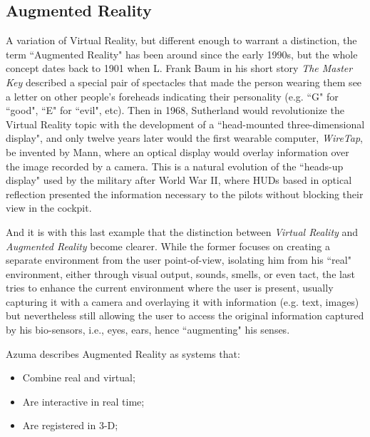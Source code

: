 \documentclass[runningheads]{llncs}
\begin{document}
\subsection{Augmented Reality}
\par A variation of Virtual Reality, but different enough to warrant a distinction, the term ``Augmented Reality" has been around since the early 1990s, but the whole concept dates back to 1901 when L. Frank Baum in his short story \textit{The Master Key} described a special pair of spectacles that made the person wearing them see a letter on other people's foreheads indicating their personality (e.g. ``G" for ``good", ``E" for ``evil", etc). Then in 1968, Sutherland would revolutionize the Virtual Reality topic with the development of a ``head-mounted three-dimensional display", and only twelve years later would the first wearable computer, \textit{WireTap}, be invented by Mann, where an optical display would overlay information over the image recorded by a camera. This is a natural evolution of the ``heads-up display" used by the military after World War II, where HUDs based in optical reflection presented the information necessary to the pilots without blocking their view in the cockpit.
\par And it is with this last example that the distinction between \textit{Virtual Reality} and \textit{Augmented Reality} become clearer. While the former focuses on creating a separate environment from the user point-of-view, isolating him from his ``real" environment, either through visual output, sounds, smells, or even tact, the last tries to enhance the current environment where the user is present, usually capturing it with a camera and overlaying it with information (e.g. text, images) but nevertheless still allowing the user to access the original information captured by his bio-sensors, i.e., eyes, ears, hence ``augmenting" his senses.
\par Azuma describes Augmented Reality as systems that:
\begin{itemize}
    \item Combine real and virtual;
    \item Are interactive in real time;
    \item Are registered in 3-D;
\end{itemize}
\end{document}
